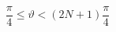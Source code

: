 \begin{equation}
\frac{\pi }{4}\leq \vartheta <\left( 2N+1\right) \frac{\pi }{4}
\label{eq110a}
\end{equation}

